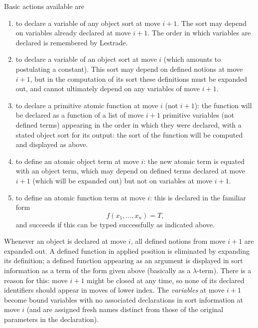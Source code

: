 \documentclass[12pt]{slides}
\begin{document}
\begin{slide}

Basic actions available are 

\begin{enumerate}

\item to declare a variable of any object sort at move $i+1$.  The sort may depend on variables already declared at move $i+1$.  The order in which variables are declared is remembered by Lestrade.

\item to declare a variable of an object sort at move $i$ (which amounts to postulating a constant).  This sort may depend on defined notions at move $i+1$,
but in the computation of its sort these definitions must be expanded out, and cannot ultimately depend on any variables of move $i+1$.

\item to declare a primitive atomic function at move $i$ (not $i+1$):  the function will be declared as a function of a list of move $i+1$ primitive variables
(not defined terms) appearing in the order in which they were declared, with a stated object sort for its output:  the sort of the function
will be computed and displayed as above.

\item to define an atomic object term at move $i$:  the new atomic term is equated with an object term, which may depend on defined terms declared
at move $i+1$ (which will be expanded out) but not on variables at move $i+1$.

\item to define an atomic function term at move $i$:  this is declared in the familiar form $$f(x_1,\ldots,x_n) = T,$$ and succeeds if this can be typed successfully as indicated above.

\end{enumerate}


\end{slide}

\begin{slide}

Whenever an object is declared at move $i$, all defined notions from move $i+1$ are expanded out.  A defined function in applied position is eliminated by expanding its definition; a defined function appearing as an argument is displayed in sort information as a term of the form given above (basically as a $\lambda$-term).   There is a reason for this:  move $i+1$ might be closed at any time, so none of its declared identifiers should appear in moves of lower index.
The {\em variables\/} at move $i+1$ become bound variables with no associated declarations in sort information at move $i$ (and are assigned fresh names distinct from those of the original parameters in the declaration).




\end{slide}
\end{document}

